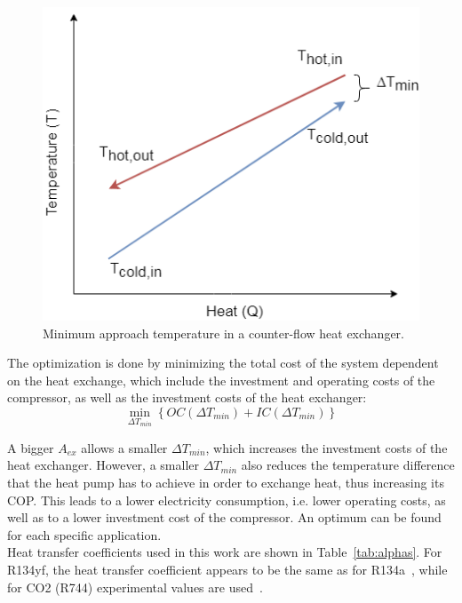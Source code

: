 \documentclass{article}
\begin{document}
\begin{figure}[htp]
	\centering
	\includegraphics[scale=0.5]{Images/dtmin.png}
	\caption{Minimum approach temperature in a counter-flow heat exchanger.}
	\label{fig:dtmin}
\end{figure}

The optimization is done by minimizing the total cost of the system dependent on the heat exchange, which include the investment and operating costs of the compressor, as well as the investment costs of the heat exchanger:
\begin{equation}
	\min_{\Delta T_{min}}\left\lbrace OC(\Delta T_{min}) + IC(\Delta T_{min}) \right\rbrace 
\end{equation}

A bigger $A_{ex}$ allows a smaller $\Delta T_{min}$, which increases the investment costs of the heat exchanger. However, a smaller $\Delta T_{min}$ also reduces the temperature difference that the heat pump has to achieve in order to exchange heat, thus increasing its COP. This leads to a lower electricity consumption, i.e. lower operating costs, as well as to a lower investment cost of the compressor. An optimum can be found for each specific application.\\

Heat transfer coefficients used in this work are shown in Table~\ref{tab:alphas}. For R134yf, the heat transfer coefficient appears to be the same as for R134a~\cite{wangOverviewHeatTransfer2013}, while for CO2 (R744) experimental values are used~\cite{ohFlowBoilingHeat2011, mastrulloComparisonR744R134a2009}. \\


\end{document}
